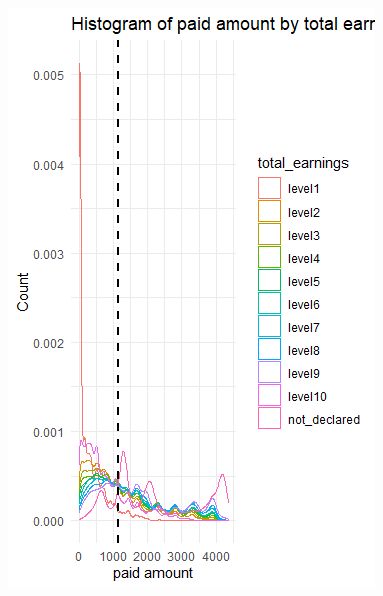 \documentclass[
]{article}
\begin{document}
\includegraphics{Paid amount by total earnings.png}
\end{document}
